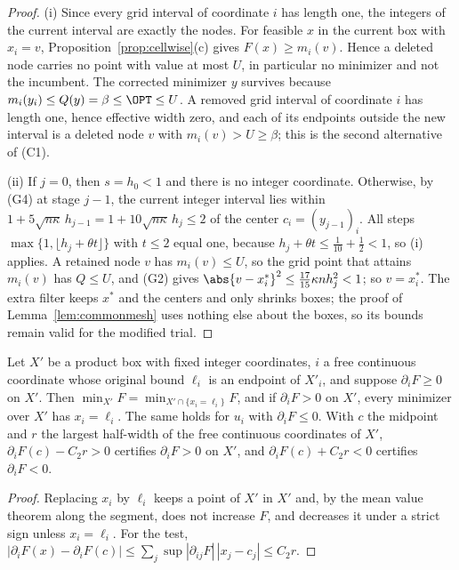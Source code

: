 \begin{proof}
(i) Since every grid interval of coordinate $i$ has length one, the integers
of the current interval are exactly the nodes. For feasible $x$ in the current
box with $x_i=v$, Proposition~\ref{prop:cellwise}(c) gives $F(x)\ge m_i(v)$.
Hence a deleted node
carries no point with value at most $U$, in particular no minimizer and not
the incumbent. The corrected minimizer $y$ survives because
$m_i(y_i)\le Q(y)=\beta\le\OPT\le U$. A removed grid interval of
coordinate $i$ has length one, hence effective width zero, and each of its
endpoints outside the new interval is a deleted node $v$ with
$m_i(v)>U\ge\beta$; this is the second alternative of (C1).

(ii) If $j=0$, then $s=h_0<1$ and there is no integer coordinate. Otherwise,
by (G4) at stage $j-1$, the current integer interval lies within
$1+5\sqrt{n\kappa}\,h_{j-1}=1+10\sqrt{n\kappa}\,h_j\le2$ of the center
$c_i=(y_{j-1})_i$. All steps $\max\{1,\lfloor h_j+\theta t\rfloor\}$ with
$t\le2$ equal one, because $h_j+\theta t\le\frac1{10}+\frac12<1$, so (i)
applies. A retained node $v$ has $m_i(v)\le U$, so the grid point that attains
$m_i(v)$ has $Q\le U$, and (G2) gives
$\abs{v-x^*_i}^2\le\frac{17}{15}\kappa nh_j^2<1$; so $v=x^*_i$. The extra
filter keeps $x^*$ and the centers and only shrinks boxes; the proof of
Lemma~\ref{lem:commonmesh} uses nothing else about the boxes, so its bounds
remain valid for the modified trial.
\end{proof}

\begin{lemma}\label{lem:monotone}
Let $X'$ be a product box with fixed integer coordinates, $i$ a free
continuous coordinate whose original bound $\ell_i$ is an endpoint of $X'_i$,
and suppose $\partial_iF\ge0$ on $X'$. Then
$\min_{X'}F=\min_{X'\cap\{x_i=\ell_i\}}F$, and if $\partial_iF>0$ on $X'$,
every minimizer over $X'$ has $x_i=\ell_i$. The same holds for $u_i$ with
$\partial_iF\le0$. With $c$ the midpoint and $r$ the largest half-width of the
free continuous coordinates of $X'$, $\partial_iF(c)-C_2r>0$ certifies
$\partial_iF>0$ on $X'$, and $\partial_iF(c)+C_2r<0$ certifies
$\partial_iF<0$.
\end{lemma}

\begin{proof}
Replacing $x_i$ by $\ell_i$ keeps a point of $X'$ in $X'$ and, by the mean
value theorem along the segment, does not increase $F$, and decreases it under
a strict sign unless $x_i=\ell_i$. For the test,
$|\partial_iF(x)-\partial_iF(c)|\le\sum_j\sup|\partial_{ij}F|\,|x_j-c_j|\le C_2r$.
\end{proof}

